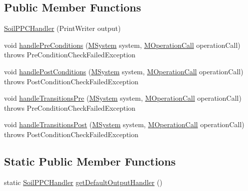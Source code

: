 \subsection*{Public Member Functions}
\begin{DoxyCompactItemize}
\item 
\hyperlink{classorg_1_1tzi_1_1use_1_1uml_1_1sys_1_1ppc_handling_1_1_soil_p_p_c_handler_a5c837d8080df07736988f0c3b76dee54}{Soil\-P\-P\-C\-Handler} (Print\-Writer output)
\item 
void \hyperlink{classorg_1_1tzi_1_1use_1_1uml_1_1sys_1_1ppc_handling_1_1_soil_p_p_c_handler_a456a85cc6e00e4d750584cabf88abf54}{handle\-Pre\-Conditions} (\hyperlink{classorg_1_1tzi_1_1use_1_1uml_1_1sys_1_1_m_system}{M\-System} system, \hyperlink{classorg_1_1tzi_1_1use_1_1uml_1_1sys_1_1_m_operation_call}{M\-Operation\-Call} operation\-Call)  throws Pre\-Condition\-Check\-Failed\-Exception 
\item 
void \hyperlink{classorg_1_1tzi_1_1use_1_1uml_1_1sys_1_1ppc_handling_1_1_soil_p_p_c_handler_aaea33e054a0da2e1319c1b331927a23b}{handle\-Post\-Conditions} (\hyperlink{classorg_1_1tzi_1_1use_1_1uml_1_1sys_1_1_m_system}{M\-System} system, \hyperlink{classorg_1_1tzi_1_1use_1_1uml_1_1sys_1_1_m_operation_call}{M\-Operation\-Call} operation\-Call)  throws Post\-Condition\-Check\-Failed\-Exception 
\item 
void \hyperlink{classorg_1_1tzi_1_1use_1_1uml_1_1sys_1_1ppc_handling_1_1_soil_p_p_c_handler_a75bbc34c615ea7c01b64c2b47cf7b25e}{handle\-Transitions\-Pre} (\hyperlink{classorg_1_1tzi_1_1use_1_1uml_1_1sys_1_1_m_system}{M\-System} system, \hyperlink{classorg_1_1tzi_1_1use_1_1uml_1_1sys_1_1_m_operation_call}{M\-Operation\-Call} operation\-Call)  throws Pre\-Condition\-Check\-Failed\-Exception 
\item 
void \hyperlink{classorg_1_1tzi_1_1use_1_1uml_1_1sys_1_1ppc_handling_1_1_soil_p_p_c_handler_a484998c2f2a5e311af36e9844be0b59c}{handle\-Transitions\-Post} (\hyperlink{classorg_1_1tzi_1_1use_1_1uml_1_1sys_1_1_m_system}{M\-System} system, \hyperlink{classorg_1_1tzi_1_1use_1_1uml_1_1sys_1_1_m_operation_call}{M\-Operation\-Call} operation\-Call)  throws Post\-Condition\-Check\-Failed\-Exception 
\end{DoxyCompactItemize}
\subsection*{Static Public Member Functions}
\begin{DoxyCompactItemize}
\item 
static \hyperlink{classorg_1_1tzi_1_1use_1_1uml_1_1sys_1_1ppc_handling_1_1_soil_p_p_c_handler}{Soil\-P\-P\-C\-Handler} \hyperlink{classorg_1_1tzi_1_1use_1_1uml_1_1sys_1_1ppc_handling_1_1_soil_p_p_c_handler_a6b5d1cce0f473e7ea4cc18039e04f2dd}{get\-Default\-Output\-Handler} ()
\end{DoxyCompactItemize}
